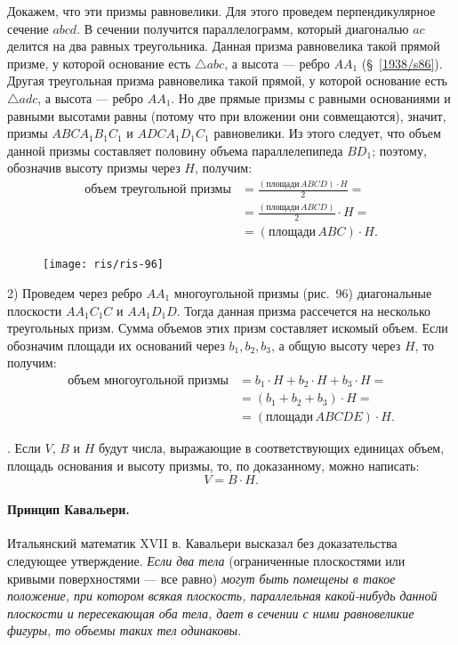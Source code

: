 \documentclass[twoside]{book}
\begin{document}
Докажем, что эти призмы равновелики.
Для этого проведем перпендикулярное сечение $abcd$.
В сечении получится параллелограмм, который диагональю $ac$ делится на два равных треугольника.
Данная призма равновелика такой прямой призме, у которой основание есть $\triangle abc$, а высота --- ребро $AA_1$ (§~\ref{1938/s86}).
Другая треугольная призма равновелика такой прямой, у которой основание есть $\triangle adc$, а высота --- ребро $AA_1$.
Но две прямые призмы с равными основаниями и равными высотами равны (потому что при вложении они совмещаются), значит, призмы $ABCA_1B_1C_1$ и $ADCA_1D_1C_1$ равновелики.
Из этого следует, что объем данной призмы составляет половину объема параллелепипеда $BD_1$;
поэтому, обозначив высоту призмы через $H$, получим:
\begin{align*}
\text{объем треугольной призмы}
&=
\frac{(\text{площади}\,ABCD)\cdot H}2=
\\
&=
\frac{(\text{площади}\,ABCD)}2\cdot H=
\\
&=
(\text{площади}\,ABC)\cdot H.
\end{align*}

\begin{figure}[h!]
\centering
\texttt{[image: ris/ris-96]}
\caption{}
\end{figure}

2) Проведем через ребро $AA_1$ многоугольной призмы (рис.~96) диагональные плоскости $AA_1C_1C$ и $AA_1D_1D$.
Тогда данная призма рассечется на несколько треугольных призм.
Сумма объемов этих призм составляет искомый объем.
Если обозначим площади их оснований через $b_1,b_2,b_3$, а общую высоту через $H$, то получим: 
\begin{align*}
\text{объем многоугольной призмы} &= b_1\cdot H + b_2 \cdot H+ b_3\cdot H=
\\
&=(b_1+ b_2+b_3)\cdot H = 
\\
&=(\text{площади}\, ABCDE)\cdot H.
\end{align*}


.
Если $V$, $B$ и $H$ будут числа, выражающие в соответствующих единицах объем, площадь основания и высоту призмы, то, по доказанному, можно написать:
\[V = B\cdot H.\]

\paragraph{Принцип Кавальери.}\label{1938/s89} 
Итальянский математик XVII в. Кавальери высказал без доказательства следующее утверждение.
\emph{Если два тела} (ограниченные плоскостями или кривыми поверхностями --- все равно) \emph{могут быть помещены в такое положение, при котором всякая плоскость, параллельная какой-нибудь данной плоскости и пересекающая оба тела, дает в сечении с ними равновеликие фигуры, то объемы таких тел одинаковы.}
\end{document}
